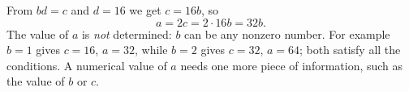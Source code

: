 From $bd=c$ and $d=16$ we get $c=16b$, so
\[
a=2c=2\cdot16b=\boxed{32b}.
\]
The value of $a$ is \emph{not} determined: $b$ can be any nonzero number. For example $b=1$ gives $c=16$, $a=32$, while $b=2$ gives $c=32$, $a=64$; both satisfy all the conditions. A numerical value of $a$ needs one more piece of information, such as the value of $b$ or $c$.
